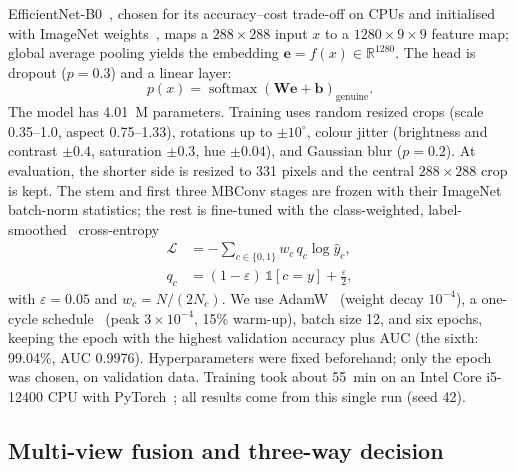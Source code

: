 \documentclass[pdflatex,iicol,sn-mathphys-num]{sn-jnl}
\begin{document}
EfficientNet-B0~\cite{tan2019efficientnet}, chosen for its accuracy--cost trade-off on
CPUs and initialised with ImageNet weights~\cite{deng2009imagenet}, maps a
$288\times288$ input $x$ to a $1280\times9\times9$ feature map; global average pooling
yields the embedding $\mathbf{e}=f(x)\in\mathbb{R}^{1280}$. The head is dropout
($p=0.3$) and a linear layer:
\begin{equation}
p(x) = \operatorname{softmax}\!\left(\mathbf{W}\mathbf{e}+\mathbf{b}\right)_{\text{genuine}} .
\label{eq:prob}
\end{equation}
The model has 4.01~M parameters. Training uses random resized crops (scale 0.35--1.0,
aspect 0.75--1.33), rotations up to $\pm10^\circ$, colour jitter (brightness and contrast
$\pm0.4$, saturation $\pm0.3$, hue $\pm0.04$), and Gaussian blur ($p=0.2$). At
evaluation, the shorter side is resized to 331 pixels and the central $288\times288$
crop is kept. The stem and first three MBConv stages are frozen with their ImageNet
batch-norm statistics; the rest is fine-tuned with the class-weighted,
label-smoothed~\cite{szegedy2016inception} cross-entropy
\begin{align}
\mathcal{L} &= -\sum_{c\in\{0,1\}} w_c\, q_c \log \hat{y}_c, \nonumber\\
q_c &= (1-\varepsilon)\,\mathbb{1}[c=y] + \tfrac{\varepsilon}{2},
\label{eq:loss}
\end{align}
with $\varepsilon=0.05$ and $w_c=N/(2N_c)$. We use AdamW~\cite{loshchilov2019adamw}
(weight decay $10^{-4}$), a one-cycle schedule~\cite{smith2019superconvergence} (peak
$3\times10^{-4}$, 15\% warm-up), batch size 12, and six epochs, keeping the epoch with
the highest validation accuracy plus AUC (the sixth: 99.04\%, AUC 0.9976).
Hyperparameters were fixed beforehand; only the epoch was chosen, on validation data. Training took about 55~min on an Intel Core i5-12400 CPU with
PyTorch~\cite{paszke2019pytorch}; all results come from this single run (seed 42).

\subsection{Multi-view fusion and three-way decision}\label{sec:decision}
\end{document}
